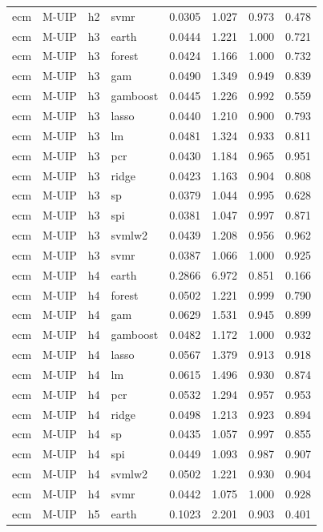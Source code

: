 \begin{ThreePartTable}
\begin{longtable}[t]{llclcccc}
ecm & M-UIP & h2 & svmr & 0.0305 & 1.027 & 0.973 & 0.478\\
\addlinespace
ecm & M-UIP & h3 & earth & 0.0444 & 1.221 & 1.000 & 0.721\\
ecm & M-UIP & h3 & forest & 0.0424 & 1.166 & 1.000 & 0.732\\
ecm & M-UIP & h3 & gam & 0.0490 & 1.349 & 0.949 & 0.839\\
ecm & M-UIP & h3 & gamboost & 0.0445 & 1.226 & 0.992 & 0.559\\
ecm & M-UIP & h3 & lasso & 0.0440 & 1.210 & 0.900 & 0.793\\
ecm & M-UIP & h3 & lm & 0.0481 & 1.324 & 0.933 & 0.811\\
ecm & M-UIP & h3 & pcr & 0.0430 & 1.184 & 0.965 & 0.951\\
ecm & M-UIP & h3 & ridge & 0.0423 & 1.163 & 0.904 & 0.808\\
ecm & M-UIP & h3 & sp & 0.0379 & 1.044 & 0.995 & 0.628\\
ecm & M-UIP & h3 & spi & 0.0381 & 1.047 & 0.997 & 0.871\\
ecm & M-UIP & h3 & svmlw2 & 0.0439 & 1.208 & 0.956 & 0.962\\
ecm & M-UIP & h3 & svmr & 0.0387 & 1.066 & 1.000 & 0.925\\
\addlinespace
ecm & M-UIP & h4 & earth & 0.2866 & 6.972 & 0.851 & 0.166\\
ecm & M-UIP & h4 & forest & 0.0502 & 1.221 & 0.999 & 0.790\\
ecm & M-UIP & h4 & gam & 0.0629 & 1.531 & 0.945 & 0.899\\
ecm & M-UIP & h4 & gamboost & 0.0482 & 1.172 & 1.000 & 0.932\\
ecm & M-UIP & h4 & lasso & 0.0567 & 1.379 & 0.913 & 0.918\\
ecm & M-UIP & h4 & lm & 0.0615 & 1.496 & 0.930 & 0.874\\
ecm & M-UIP & h4 & pcr & 0.0532 & 1.294 & 0.957 & 0.953\\
ecm & M-UIP & h4 & ridge & 0.0498 & 1.213 & 0.923 & 0.894\\
ecm & M-UIP & h4 & sp & 0.0435 & 1.057 & 0.997 & 0.855\\
ecm & M-UIP & h4 & spi & 0.0449 & 1.093 & 0.987 & 0.907\\
ecm & M-UIP & h4 & svmlw2 & 0.0502 & 1.221 & 0.930 & 0.904\\
ecm & M-UIP & h4 & svmr & 0.0442 & 1.075 & 1.000 & 0.928\\
\addlinespace
ecm & M-UIP & h5 & earth & 0.1023 & 2.201 & 0.903 & 0.401\\

\end{longtable}
\end{ThreePartTable}
